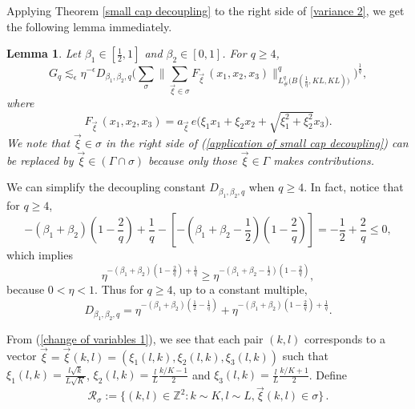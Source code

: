 \documentclass[11pt]{amsart}
\numberwithin{equation}{section}
\newtheorem{lemma}[theorem]{Lemma}
\theoremstyle{definition}
\theoremstyle{proposition}
\begin{document}
Applying Theorem \ref{small cap decoupling} to the right side of  \eqref{variance 2}, we get the following lemma immediately.

\begin{lemma}
Let $\beta_1\in [\frac{1}{2},1]$ and $\beta_2\in[0,1]$. For $q\ge 4$,
\begin{equation}  \label{application of small cap decoupling} 
G_q \lesssim_\epsilon \eta^{-\epsilon} D_{\beta_1,\beta_2,q}\Big(\sum_{\sigma}\Big\|\sum_{\Vec{\xi}\in \sigma} F_{\Vec{\xi}} \,(x_1,x_2,x_3)\Big\|^q_{L^q_{\#}\Big(B(\frac{1}{\eta},KL,KL)\Big)}\Big)^\frac{1}{q},   
\end{equation}
where 
\[
F_{\Vec{\xi}}\,(x_1,x_2,x_3)=a_{\Vec{\xi}}\,e\Big(\xi_1 x_1+\xi_2 x_2+\sqrt{\xi_1^2+\xi_2^2}x_3\Big).
\]
We note that $\Vec{\xi}\in \sigma$ in the right side of (\ref{application of small cap decoupling}) can be replaced by
 $\Vec{\xi}\in (\Gamma\cap \sigma)$ because only  those $ \Vec{\xi}\in\Gamma$ makes contributions. 
\end{lemma}

We can simplify the decoupling constant $D_{\beta_1, \beta_2, q}$ when $q\geq 4$. In fact, notice that for $q\ge 4$,
\[
-(\beta_1+\beta_2)(1-\frac{2}{q})+\frac{1}{q}-[-(\beta_1+\beta_2-\frac{1}{2})(1-\frac{2}{q})]
= -\frac{1}{2}+\frac{2}{q} 
\le 0,
\]
which implies 
\[
\eta^{-(\beta_1+\beta_2)(1-\frac{2}{q})+\frac{1}{q}}\ge \eta^{-(\beta_1+\beta_2-\frac{1}{2})(1-\frac{2}{q})},
\]
because $0<\eta<1$. Thus for $q\ge 4$, up to a constant multiple,
\begin{equation}  \label{decoupling constant}
D_{\beta_1,\beta_2,q}=\eta^{-(\beta_1+\beta_2)(\frac{1}{2}-\frac{1}{q})}+\eta^{-(\beta_1+\beta_2)(1-\frac{2}{q})+\frac{1}{q}}.   
\end{equation}  

From (\ref{change of variables 1}), we see that each pair $(k, l)$ corresponds to a vector $\Vec{\xi}=\vec{\xi}(k, l)=
(\xi_1(l,k), \xi_2(l,k), \xi_3(l,k))$
such that $\xi_1(l,k)=\frac{l\sqrt{k}}{L\sqrt{K}} $, $ \xi_2(l,k)=\frac{l}{L} \frac{k/K-1}{2} $ and $\xi_3(l,k)=
 \frac{l}{L} \frac{k/K+1}{2}$.  Define 
\begin{equation}
{\mathcal R}_\sigma := \bigg\{(k, l)\in\mathbb Z^2: k\sim K, l\sim L,  \vec{\xi}(k, l)\in\sigma\bigg\}\,. 
\end{equation}
\end{document}

